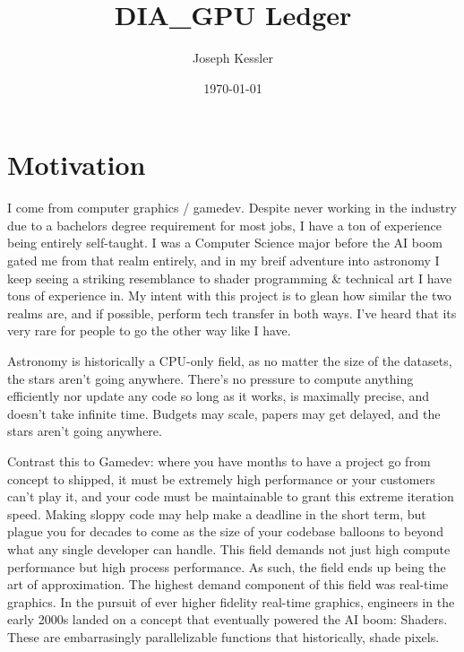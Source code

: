 \documentclass[%
 reprint,
 amsmath,amssymb,
 aps,
showkeys,
]{revtex4-2}
\begin{document}
\title{DIA_GPU Ledger} %
\author{Joseph Kessler}


\date{\today} %


\maketitle
\section{Motivation}

I come from computer graphics / gamedev. Despite never working in the industry due to a bachelors degree requirement for most jobs, I have a ton of experience being entirely self-taught. I was a Computer Science major before the AI boom gated me from that realm entirely, and in my breif adventure into astronomy I keep seeing a striking resemblance to shader programming & technical art I have tons of experience in. My intent with this project is to glean how similar the two realms are, and if possible, perform tech transfer in both ways. I've heard that its very rare for people to go the other way like I have.

Astronomy is historically a CPU-only field, as no matter the size of the datasets, the stars aren't going anywhere.  There's no pressure to compute anything efficiently nor update any code so long as it works, is maximally precise, and doesn't take infinite time.  Budgets may scale, papers may get delayed, and the stars aren't going anywhere.

Contrast this to Gamedev: where you have months to have a project go from concept to shipped, it must be extremely high performance or your customers can't play it, and your code must be maintainable to grant this extreme iteration speed. Making sloppy code may help make a deadline in the short term, but plague you for decades to come as the size of your codebase balloons to beyond what any single developer can handle.  This field demands not just high compute performance but high process performance. As such, the field ends up being the art of approximation. The highest demand component of this field was real-time graphics. In the pursuit of ever higher fidelity real-time graphics, engineers in the early 2000s landed on a concept that eventually powered the AI boom: Shaders. These are embarrasingly parallelizable functions that historically, shade pixels. 
\end{document}
